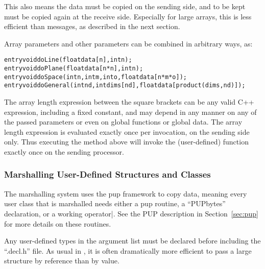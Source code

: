 This also means the data must be copied on the sending 
side, and to be kept must be copied again 
at the receive side.  Especially for large arrays, this 
is less efficient than messages, as described in the next section.

Array parameters and other parameters can be combined in arbitrary ways, as:
\begin{alltt}
  entry void doLine(float data[n],int n);
  entry void doPlane(float data[n*n],int n);
  entry void doSpace(int n,int m,int o,float data[n*m*o]);
  entry void doGeneral(int nd,int dims[nd],float data[product(dims,nd)]);
\end{alltt}
The array length expression between the square brackets can be 
any valid C++ expression, including a fixed constant, and may depend 
in any manner on any of the passed
parameters or even on global functions or global data.  The array length 
expression is evaluated exactly once per invocation, on the sending side only.
Thus executing the  method above will invoke the 
(user-defined)  function exactly once on the sending
processor.

\subsubsection{Marshalling User-Defined Structures and Classes}

The marshalling system uses the pup framework to copy data,
meaning every user class that is marshalled needs either a
pup routine, a ``PUPbytes'' declaration, or a working operator|.
See the PUP description in Section~\ref{sec:pup} for more details 
on these routines.

Any user-defined types in the argument list must be declared 
before including the ``.decl.h'' file.
As usual in \CC, it is often dramatically more efficient to pass
a large structure by reference than by value.

